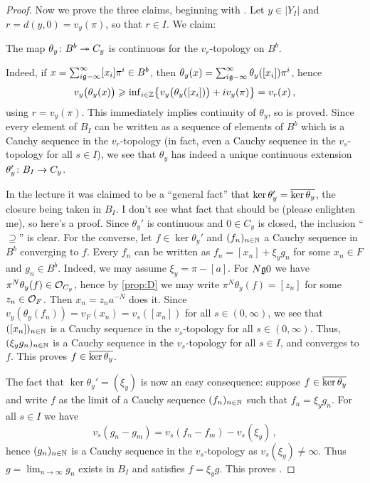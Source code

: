 \documentclass[a4paper, 10pt, oneside, DIV=9, chapterprefix=true, numbers=enddot,bibliography=totoc]{scrbook}
\begin{document}
\begin{proof}
	Now we prove the three claims, beginning with . Let $y\in |Y_I|$ and $r=d(y,0)=v_y(\pi)$, so that $r\in I$. We claim:
	\begin{alphanumerate}
		\item[\itememph{*}] The map $\theta_y\colon B^b\epimorphism C_y$ is continuous for the $v_r$-topology on $B^b$.
	\end{alphanumerate}
	Indeed, if $x=\sum_{i\gge -\infty}^\infty [x_i]\pi^i\in B^b$, then $\theta_y(x)=\sum_{i\gge -\infty}^\infty \theta_y([x_i])\pi^i$, hence
	\begin{equation*}
		v_y\big(\theta_y(x)\big)\geqslant \mathrm{inf}_{i\in\mathbb{Z}}\big\{v_y\big(\theta_y([x_i])\big)+iv_y(\pi)\big\}=v_r(x)\,,
	\end{equation*}
	using $r=v_y(\pi)$. This immediately implies continuity of $\theta_y$, so \itememph{*} is proved. Since every element of $B_I$ can be written as a sequence of elements of $B^b$ which is a Cauchy sequence in the $v_r$-topology (in fact, even a Cauchy sequence in the $v_s$-topology for all $s\in I$), we see that $\theta_y$ has indeed a unique continuous extension $\theta_y'\colon B_I\morphism C_y$.
	
	In the lecture it was claimed to be a \enquote{general fact} that $\ker \theta_y'=\ov{\ker\theta_y}$, the closure being taken in $B_I$. I don't see what fact that should be (please enlighten me), so here's a proof. Since $\theta_y'$ is continuous and $0\in C_y$ is closed, the inclusion \enquote{$\supseteq$} is clear. For the converse, let $f\in\ker\theta_y'$ and $(f_n)_{n\in\mathbb{N}}$ a Cauchy sequence in $B^b$ converging to $f$. Every $f_n$ can be written as $f_n=[x_n]+\xi_y g_n$ for some $x_n\in F$ and $g_n\in B^b$. Indeed, we may assume $\xi_y=\pi-[a]$. For $N\gge 0$ we have $\pi^N\theta_y(f)\in \mathcal{O}_{C_y}$, hence by \cref{prop:D} we may write $\pi^N\theta_y(f)=[z_n]$ for some $z_n\in \mathcal{O}_F$. Then $x_n=z_na^{-N}$ does it. Since $v_y(\theta_y(f_n))=v_F(x_n)=v_s([x_n])$ for all $s\in (0,\infty)$, we see that $([x_n])_{n\in\mathbb{N}}$ is a Cauchy sequence in the $v_s$-topology for all $s\in (0,\infty)$. Thus, $(\xi_yg_n)_{n\in\mathbb{N}}$ is a Cauchy sequence in the $v_s$-topology for all $s\in I$, and converges to $f$. This proves $f\in\ov{\ker\theta_y}$.
	
	The fact that $\ker\theta_y'=(\xi_y)$ is now an easy consequence: suppose $f\in\ov{\ker\theta_y}$ and write $f$ as the limit of a Cauchy sequence $(f_n)_{n\in\mathbb{N}}$ such that $f_n=\xi_yg_n$. For all $s\in I$ we have
	\begin{equation*}
		v_s(g_n-g_m)=v_s(f_n-f_m)-v_s(\xi_y)\,,
	\end{equation*}
	hence $(g_n)_{n\in\mathbb{N}}$ is a Cauchy sequence in the $v_s$-topology as $v_s(\xi_y)\neq \infty$. Thus $g=\lim_{n\to\infty}g_n$ exists in $B_I$ and satisfies $f=\xi_yg$. This proves .
	

\end{proof}
\end{document}
